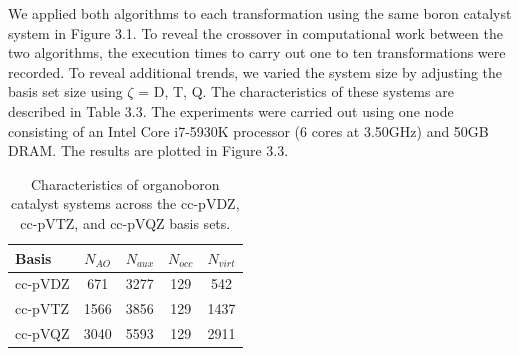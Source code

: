 We applied both algorithms to each transformation using the
same boron catalyst system in Figure 3.1. To reveal the crossover in computational work between the two algorithms, 
the execution times to carry out one to ten transformations were recorded. To reveal additional trends, we varied the
system size by adjusting the basis set size using $\zeta$ = D, T, Q. The characteristics of these systems are described in Table 3.3.
The experiments were carried out using one node consisting of an Intel Core i7-5930K processor
(6 cores at 3.50GHz) and 50GB DRAM. The results are plotted in Figure 3.3.
 
\begingroup
\begin{table}[H]
\centering
\renewcommand{\baselinestretch}{1}
\caption{Characteristics of organoboron catalyst systems across the cc-pVDZ, cc-pVTZ, and cc-pVQZ basis sets.}
\begin{tabular}{l cccc}
\multicolumn{1}{l}{\textbf{Basis}} &
\multicolumn{1}{c}{\textbf{$N_{AO}$}} &
\multicolumn{1}{c}{\textbf{$N_{aux}$}} &
\multicolumn{1}{c}{\textbf{$N_{occ}$}} &
\multicolumn{1}{c}{\textbf{$N_{virt}$}} \\
\hline
cc-pVDZ   & 671  & 3277      & 129       & 542        \\ 
cc-pVTZ   & 1566 & 3856      & 129       & 1437       \\ 
cc-pVQZ   & 3040 & 5593      & 129       & 2911       \\ 
\end{tabular}
\end{table}
\endgroup

